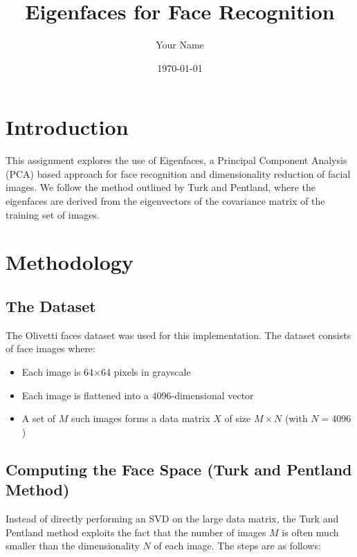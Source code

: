 \documentclass[a4paper, 12pt]{article}
\title{\Large\textbf{Eigenfaces for Face Recognition}}
\author{Your Name}
\date{\today}
\begin{document}
\maketitle

\section*{Introduction}
This assignment explores the use of Eigenfaces, a Principal Component Analysis (PCA) based approach for face recognition and dimensionality reduction of facial images. We follow the method outlined by Turk and Pentland, where the eigenfaces are derived from the eigenvectors of the covariance matrix of the training set of images.

\section*{Methodology}

\subsection*{The Dataset}
The Olivetti faces dataset was used for this implementation. The dataset consists of face images where:
\begin{itemize}
    \item Each image is 64×64 pixels in grayscale
    \item Each image is flattened into a 4096-dimensional vector
    \item A set of $M$ such images forms a data matrix $X$ of size $M \times N$ (with $N=4096$)
\end{itemize}

\subsection*{Computing the Face Space (Turk and Pentland Method)}
Instead of directly performing an SVD on the large data matrix, the Turk and Pentland method exploits the fact that the number of images $M$ is often much smaller than the dimensionality $N$ of each image. The steps are as follows:
\end{document}
